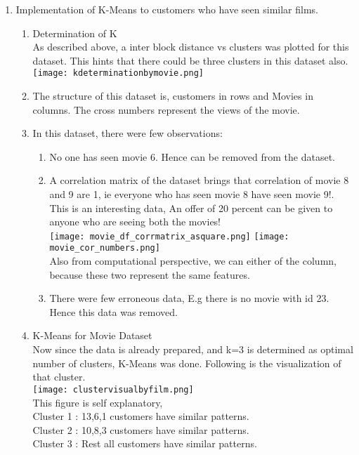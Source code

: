 \documentclass{article}
\begin{document}
\begin{enumerate}
\item Implementation of K-Means to customers who have seen similar films.
\begin{enumerate}
\item Determination of K \\
As described above, a inter block distance vs clusters was plotted for this dataset. This hints that there could be three clusters in this dataset also.\\
\texttt{[image: kdeterminationbymovie.png]}\\
\item The structure of this dataset is, customers in rows and Movies in columns. The cross numbers represent the views of the movie.
\item In this dataset, there were few observations: \\
\begin{enumerate}
\item No one has seen movie 6. Hence can be removed from the dataset.
\item A correlation matrix of the dataset brings that correlation of movie 8 and 9 are 1, ie everyone who has seen movie 8 have seen movie 9!.\\ This is an interesting data, An offer of 20 percent can be given to anyone who are seeing both the movies!\\
\texttt{[image: movie\_df\_corrmatrix\_asquare.png]}
\texttt{[image: movie\_cor\_numbers.png]}\\
Also from computational perspective, we can either of the column, because these two represent the same features.
\item There were few erroneous data, E.g there is no movie with id 23. Hence this data was removed.
\end{enumerate}
\item K-Means for Movie Dataset\\
Now since the data is already prepared, and k=3 is determined as optimal number of clusters, K-Means was done. Following is the visualization of that cluster.\\
\texttt{[image: clustervisualbyfilm.png]}\\
This figure is self explanatory,\\
Cluster 1 : 13,6,1 customers have similar patterns.\\
Cluster 2 : 10,8,3 customers have similar patterns.\\
Cluster 3 : Rest all customers have similar patterns.
\end{enumerate}
\end{enumerate}
\end{document}
